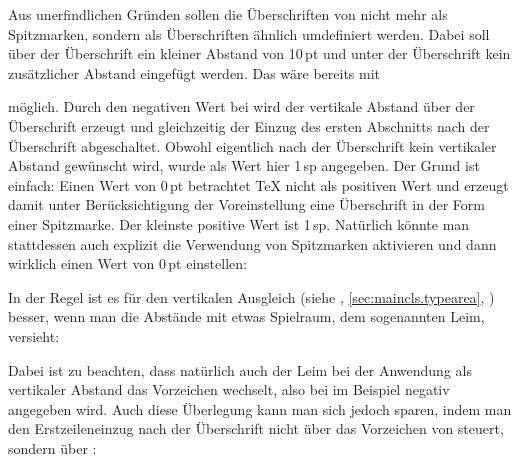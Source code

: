 \begin{Example}
  Aus unerfindlichen Gründen sollen die Überschriften von
   nicht mehr als Spitzmarken, sondern als
  Überschriften ähnlich  umdefiniert
  werden. Dabei soll über der Überschrift ein kleiner Abstand von 10\,pt und
  unter der Überschrift kein zusätzlicher Abstand eingefügt werden. Das wäre
  bereits mit
\begin{lstcode}
\end{lstcode}
  möglich. Durch den negativen Wert bei  wird der vertikale
  Abstand über der Überschrift erzeugt und gleichzeitig der Einzug des ersten
  Abschnitts nach der Überschrift abgeschaltet. Obwohl eigentlich nach der
  Überschrift kein vertikaler Abstand gewünscht wird, wurde als Wert hier
  1\,sp angegeben. Der Grund ist einfach: Einen Wert von 0\,pt betrachtet
  \TeX{} nicht als positiven Wert und  erzeugt
  damit unter Berücksichtigung der Voreinstellung 
  eine Überschrift in der Form einer Spitzmarke. Der kleinste positive Wert
  ist 1\,sp. Natürlich könnte man stattdessen auch explizit die Verwendung von
  Spitzmarken aktivieren und dann wirklich einen Wert von 0\,pt einstellen:
\begin{lstcode}
\end{lstcode}

  In der Regel ist es für den vertikalen Ausgleich (siehe
  , \autoref{sec:maincls.typearea},
  ) besser, wenn man die Abstände
  mit etwas Spielraum, dem sogenannten Leim, versieht:
\begin{lstcode}
\end{lstcode}
  Dabei ist zu beachten, dass natürlich auch der Leim bei der Anwendung als
  vertikaler Abstand das Vorzeichen wechselt, also bei  im
  Beispiel negativ angegeben wird. Auch diese Überlegung kann man sich jedoch
  sparen, indem man den Erstzeileneinzug nach der Überschrift nicht über das
  Vorzeichen von  steuert, sondern über
  :
\begin{lstcode}
\end{lstcode}
\end{Example}

